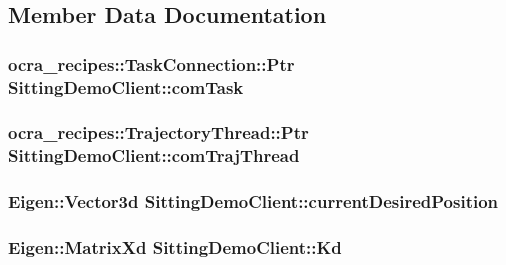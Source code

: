 \subsection{\-Member \-Data \-Documentation}
\hypertarget{classSittingDemoClient_aa843c7358b6c9525d4d0cd6f3db27878}{
\subsubsection[{com\-Task}]{\setlength{\rightskip}{0pt plus 5cm}ocra\-\_\-recipes\-::\-Task\-Connection\-::\-Ptr {\bf \-Sitting\-Demo\-Client\-::com\-Task}}}\label{classSittingDemoClient_aa843c7358b6c9525d4d0cd6f3db27878}
\hypertarget{classSittingDemoClient_a91f2f57bfaeb3a43247836823401b71d}{
\subsubsection[{com\-Traj\-Thread}]{\setlength{\rightskip}{0pt plus 5cm}ocra\-\_\-recipes\-::\-Trajectory\-Thread\-::\-Ptr {\bf \-Sitting\-Demo\-Client\-::com\-Traj\-Thread}}}\label{classSittingDemoClient_a91f2f57bfaeb3a43247836823401b71d}
\hypertarget{classSittingDemoClient_a026778b7ccf56bc9674ef84f8700f66e}{
\subsubsection[{current\-Desired\-Position}]{\setlength{\rightskip}{0pt plus 5cm}\-Eigen\-::\-Vector3d {\bf \-Sitting\-Demo\-Client\-::current\-Desired\-Position}}}\label{classSittingDemoClient_a026778b7ccf56bc9674ef84f8700f66e}
\hypertarget{classSittingDemoClient_a66a12899f7f64dbfa1c1dc5dc641a1b0}{
\subsubsection[{\-Kd}]{\setlength{\rightskip}{0pt plus 5cm}\-Eigen\-::\-Matrix\-Xd {\bf \-Sitting\-Demo\-Client\-::\-Kd}}}\label{classSittingDemoClient_a66a12899f7f64dbfa1c1dc5dc641a1b0}
